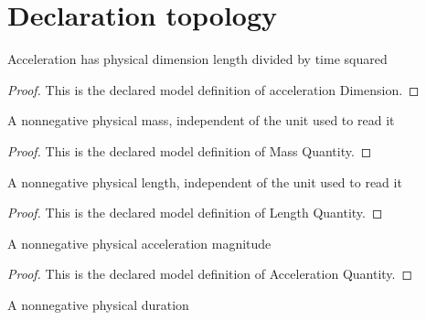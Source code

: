 \section{Declaration topology}
\begin{definition}
  \label{def:physics:phyx-mini-0284:phyxminiproblems-problemphyxmini0284-accelerationdimension}
  Acceleration has physical dimension length divided by time squared
\end{definition}
\begin{proof}
  This is the declared model definition of acceleration Dimension.
\end{proof}
\begin{definition}
  \label{def:physics:phyx-mini-0284:phyxminiproblems-problemphyxmini0284-massquantity}
  A nonnegative physical mass, independent of the unit used to read it
\end{definition}
\begin{proof}
  This is the declared model definition of Mass Quantity.
\end{proof}
\begin{definition}
  \label{def:physics:phyx-mini-0284:phyxminiproblems-problemphyxmini0284-lengthquantity}
  A nonnegative physical length, independent of the unit used to read it
\end{definition}
\begin{proof}
  This is the declared model definition of Length Quantity.
\end{proof}
\begin{definition}
  \label{def:physics:phyx-mini-0284:phyxminiproblems-problemphyxmini0284-accelerationquantity}
  A nonnegative physical acceleration magnitude
\end{definition}
\begin{proof}
  This is the declared model definition of Acceleration Quantity.
\end{proof}
\begin{definition}
  \label{def:physics:phyx-mini-0284:phyxminiproblems-problemphyxmini0284-timequantity}
  A nonnegative physical duration
\end{definition}
